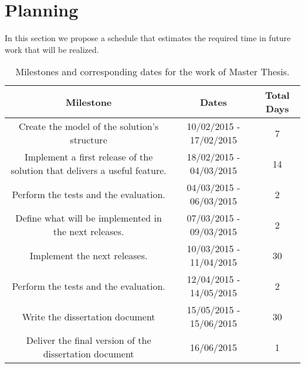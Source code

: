 \section{Planning}
\label{sec:Planning}
In this section we propose a schedule that estimates the required time in future work that will be realized.
\begin{table}[h]
  \begin{tabular}{|c|c|c|}
    \hline
    \textbf{Milestone}                                                         & \textbf{Dates}          & \textbf{Total Days} \\ \hline
    Create the model of the solution's structure                                & 10/02/2015 - 17/02/2015  & 7          \\ \hline
    Implement a first release of the solution that delivers a useful feature.   & 18/02/2015 - 04/03/2015  & 14         \\ \hline
    Perform the tests and the evaluation.                                       & 04/03/2015 - 06/03/2015  & 2          \\ \hline
    Define what will be implemented in the next releases.                       & 07/03/2015 - 09/03/2015  & 2          \\ \hline
    Implement the next releases.                                                & 10/03/2015 - 11/04/2015  & 30         \\ \hline
    Perform the tests and the evaluation.                                       & 12/04/2015 - 14/05/2015  & 2          \\ \hline
    Write the dissertation document                                             & 15/05/2015 - 15/06/2015  & 30         \\ \hline
    Deliver the final version of the dissertation document                      & 16/06/2015               & 1          \\ \hline
  \end{tabular}
  \caption {Milestones and corresponding dates for the work of Master Thesis.}
\end{table}
